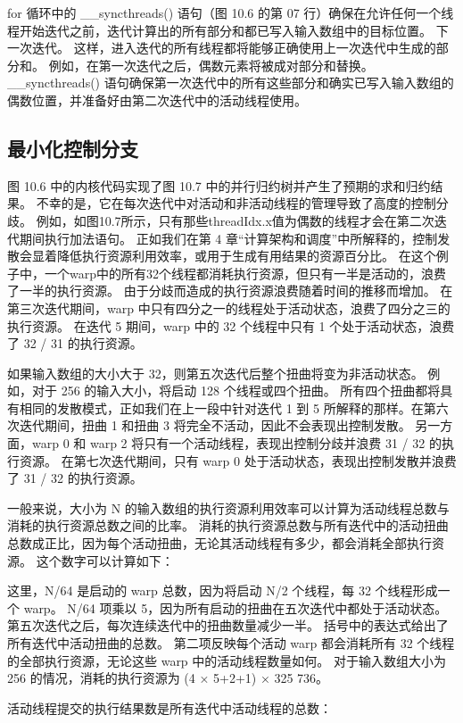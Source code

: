 for 循环中的 \_\_syncthreads() 语句（图 10.6 的第 07 行）确保在允许任何一个线程开始迭代之前，迭代计算出的所有部分和都已写入输入数组中的目标位置。 下一次迭代。 这样，进入迭代的所有线程都将能够正确使用上一次迭代中生成的部分和。 例如，在第一次迭代之后，偶数元素将被成对部分和替换。 \_\_syncthreads() 语句确保第一次迭代中的所有这些部分和确实已写入输入数组的偶数位置，并准备好由第二次迭代中的活动线程使用。

\subsection{最小化控制分支}
图 10.6 中的内核代码实现了图 10.7 中的并行归约树并产生了预期的求和归约结果。 不幸的是，它在每次迭代中对活动和非活动线程的管理导致了高度的控制分歧。 例如，如图10.7所示，只有那些threadIdx.x值为偶数的线程才会在第二次迭代期间执行加法语句。 正如我们在第 4 章“计算架构和调度”中所解释的，控制发散会显着降低执行资源利用效率，或用于生成有用结果的资源百分比。 在这个例子中，一个warp中的所有32个线程都消耗执行资源，但只有一半是活动的，浪费了一半的执行资源。 由于分歧而造成的执行资源浪费随着时间的推移而增加。 在第三次迭代期间，warp 中只有四分之一的线程处于活动状态，浪费了四分之三的执行资源。 在迭代 5 期间，warp 中的 32 个线程中只有 1 个处于活动状态，浪费了 32 / 31 的执行资源。

如果输入数组的大小大于 32，则第五次迭代后整个扭曲将变为非活动状态。 例如，对于 256 的输入大小，将启动 128 个线程或四个扭曲。 所有四个扭曲都将具有相同的发散模式，正如我们在上一段中针对迭代 1 到 5 所解释的那样。在第六次迭代期间，扭曲 1 和扭曲 3 将完全不活动，因此不会表现出控制发散。 另一方面，warp 0 和 warp 2 将只有一个活动线程，表现出控制分歧并浪费 31 / 32 的执行资源。 在第七次迭代期间，只有 warp 0 处于活动状态，表现出控制发散并浪费了 31 / 32 的执行资源。

一般来说，大小为 N 的输入数组的执行资源利用效率可以计算为活动线程总数与消耗的执行资源总数之间的比率。 消耗的执行资源总数与所有迭代中的活动扭曲总数成正比，因为每个活动扭曲，无论其活动线程有多少，都会消耗全部执行资源。 这个数字可以计算如下：

这里，N/64 是启动的 warp 总数，因为将启动 N/2 个线程，每 32 个线程形成一个 warp。 N/64 项乘以 5，因为所有启动的扭曲在五次迭代中都处于活动状态。 第五次迭代之后，每次连续迭代中的扭曲数量减少一半。 括号中的表达式给出了所有迭代中活动扭曲的总数。 第二项反映每个活动 warp 都会消耗所有 32 个线程的全部执行资源，无论这些 warp 中的活动线程数量如何。 对于输入数组大小为 256 的情况，消耗的执行资源为 (4 × 5+2+1) × 325 736。

活动线程提交的执行结果数是所有迭代中活动线程的总数：

